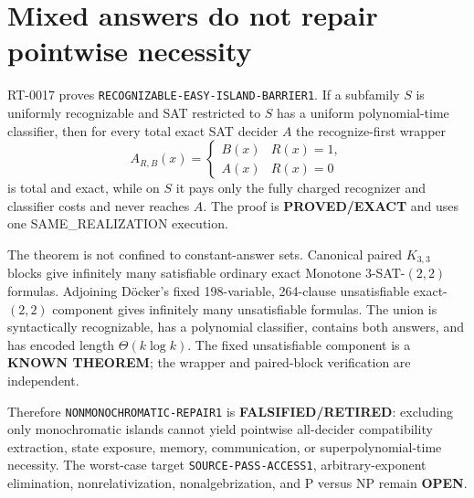 \section{Mixed answers do not repair pointwise necessity}

RT-0017 proves \texttt{RECOGNIZABLE-EASY-ISLAND-BARRIER1}.  If a subfamily
$S$ is uniformly recognizable and SAT restricted to $S$ has a uniform
polynomial-time classifier, then for every total exact SAT decider $A$ the
recognize-first wrapper
\[
 A_{R,B}(x)=\begin{cases}B(x)&R(x)=1,\\A(x)&R(x)=0\end{cases}
\]
is total and exact, while on $S$ it pays only the fully charged recognizer and
classifier costs and never reaches $A$.  The proof is \textbf{PROVED/EXACT}
and uses one SAME\_REALIZATION execution.

The theorem is not confined to constant-answer sets.  Canonical paired
$K_{3,3}$ blocks give infinitely many satisfiable ordinary exact Monotone
3-SAT-$(2,2)$ formulas.  Adjoining D\"ocker's fixed 198-variable,
264-clause unsatisfiable exact-$(2,2)$ component gives infinitely many
unsatisfiable formulas.  The union is syntactically recognizable, has a
polynomial classifier, contains both answers, and has encoded length
$\Theta(k\log k)$.  The fixed unsatisfiable component is a \textbf{KNOWN
THEOREM}; the wrapper and paired-block verification are independent.

Therefore \texttt{NONMONOCHROMATIC-REPAIR1} is
\textbf{FALSIFIED/RETIRED}: excluding only monochromatic islands cannot yield
pointwise all-decider compatibility extraction, state exposure, memory,
communication, or superpolynomial-time necessity.  The worst-case target
\texttt{SOURCE-PASS-ACCESS1}, arbitrary-exponent elimination,
nonrelativization, nonalgebrization, and P versus NP remain \textbf{OPEN}.

